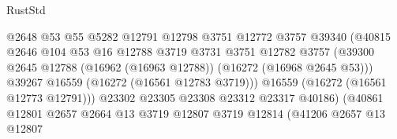\begin{lexlean}{RustStd}
\begin{coremodule}
                                            @2648
                                            @53
                                            @55
                                            @5282
                                            @12791
                                            @12798
                                            @3751
                                            @12772
                                            @3757
                                            @39340
                                            (@40815
                                              @2646
                                              @104
                                              @53
                                              @16
                                              @12788
                                              @3719
                                              @3731
                                              @3751
                                              @12782
                                              @3757
                                              (@39300
                                                @2645
                                                @12788
                                                (@16962 (@16963 @12788))
                                                (@16272 (@16968 @2645 @53)))
                                              @39267
                                              @16559
                                              (@16272 (@16561 @12783 @3719)))
                                            @16559
                                            (@16272 (@16561 @12773 @12791)))
                                          @23302
                                          @23305
                                          @23308
                                          @23312
                                          @23317
                                          @40186)
                                        (@40861
                                          @12801
                                          @2657
                                          @2664
                                          @13
                                          @3719
                                          @12807
                                          @3719
                                          @12814
                                          (@41206
                                            @2657
                                            @13
                                            @12807

\end{coremodule}
\end{lexlean}

